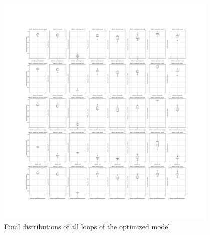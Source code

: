 \documentclass[12pt, a4paper]{article}
\begin{document}
\begin{figure}[H]
    \begin{center}
        \includegraphics[width=0.95\textwidth]{figures/RNCV/Optimized/All loop outer folds boxplots.png}
        \caption{Final distributions of all loops of the optimized model}\label{fig:optuna desc}
    \end{center}
\end{figure}
\end{document}
